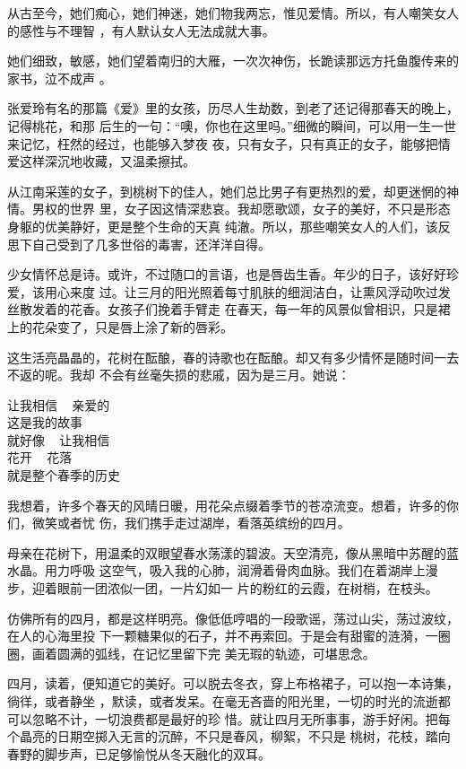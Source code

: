 \documentclass[12pt,a4paper]{article}
\begin{document}
		从古至今，她们痴心，她们神迷，她们物我两忘，惟见爱情。所以，有人嘲笑女人的感性与不理智
	，有人默认女人无法成就大事。

		她们细致，敏感，她们望着南归的大雁，一次次神伤，长跪读那远方托鱼腹传来的家书，泣不成声
	。

		张爱玲有名的那篇《爱》里的女孩，历尽人生劫数，到老了还记得那春天的晚上，记得桃花，和那
	后生的一句：“噢，你也在这里吗。”细微的瞬间，可以用一生一世来记忆，枉然的经过，也能够入梦夜
	夜，只有女子，只有真正的女子，能够把情爱这样深沉地收藏，又温柔擦拭。


		从江南采莲的女子，到桃树下的佳人，她们总比男子有更热烈的爱，却更迷惘的神情。男权的世界
	里，女子因这情深悲哀。我却愿歌颂，女子的美好，不只是形态身躯的优美静好，更是整个生命的天真
	纯澈。所以，那些嘲笑女人的人们，该反思下自己受到了几多世俗的毒害，还洋洋自得。


		少女情怀总是诗。或许，不过随口的言语，也是唇齿生香。年少的日子，该好好珍爱，该用心来度
	过。让三月的阳光照着每寸肌肤的细润洁白，让熏风浮动吹过发丝散发着的花香。女孩子们挽着手臂走
	在春天，每一年的风景似曾相识，只是裙上的花朵变了，只是唇上涂了新的唇彩。


		这生活亮晶晶的，花树在酝酿，春的诗歌也在酝酿。却又有多少情怀是随时间一去不返的呢。我却
	不会有丝毫失损的悲戚，因为是三月。她说：

		\longpoem{}{}{}
		让我相信 ~ 亲爱的 \\
		这是我的故事 \\
		就好像 ~ 让我相信 \\
		花开 ~ 花落 \\
		就是整个春季的历史
		\endlongpoem

	\endwriting



		我想着，许多个春天的风晴日暖，用花朵点缀着季节的苍凉流变。想着，许多的你们，微笑或者忧
	伤，我们携手走过湖岸，看落英缤纷的四月。

		母亲在花树下，用温柔的双眼望春水荡漾的碧波。天空清亮，像从黑暗中苏醒的蓝水晶。用力呼吸
	这空气，吸入我的心肺，润滑着骨肉血脉。我们在着湖岸上漫步，迎着眼前一团浓似一团，一片幻如一
	片的粉红的云霞，在树梢，在枝头。

		仿佛所有的四月，都是这样明亮。像低低哼唱的一段歌谣，荡过山尖，荡过波纹，在人的心海里投
	下一颗糖果似的石子，并不再索回。于是会有甜蜜的涟漪，一圈圈，画着圆满的弧线，在记忆里留下完
	美无瑕的轨迹，可堪思念。

		四月，读着，便知道它的美好。可以脱去冬衣，穿上布格裙子，可以抱一本诗集，徜徉，或者静坐
	，默读，或者发呆。在毫无吝啬的阳光里，一切的时光的流逝都可以忽略不计，一切浪费都是最好的珍
	惜。就让四月无所事事，游手好闲。把每个晶亮的日期空掷入无言的沉醉，不只是春风，柳絮，不只是
	桃树，花枝，踏向春野的脚步声，已足够愉悦从冬天融化的双耳。
\end{document}

